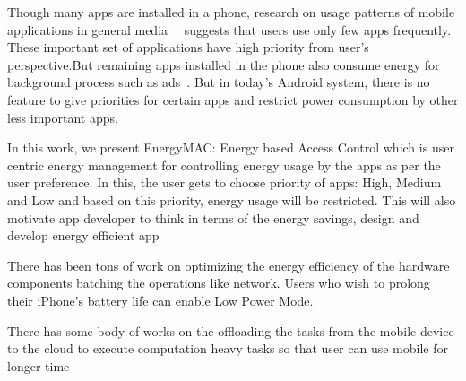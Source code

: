 Though many apps are installed in a phone, research on usage patterns of mobile applications in general media~\cite{techcrunch85}~\cite{techcrunch63} suggests that users use only few apps frequently. These important set of applications have high priority from user's perspective.But remaining apps installed in the phone also consume energy for background process such as ads~\cite{stevens2012investigating}. But in today's Android system, there is no feature to give priorities for certain apps and restrict power consumption by other less important apps. 

In this work, we present EnergyMAC: Energy based Access Control which is user centric energy management for controlling energy usage by the apps as per the user preference. In this, the user gets to choose priority of apps: High, Medium and Low and based on this priority, energy usage will be restricted.  This will also motivate app developer to think in terms of the energy savings, design and develop energy efficient app


There has been tons of work on optimizing the energy efficiency of the hardware components batching the operations like network. Users who wish to prolong their iPhone’s battery life can enable Low Power Mode.%

There has some body of works on the offloading the tasks from the mobile device to the cloud to execute computation heavy tasks so that user can use mobile for longer time

